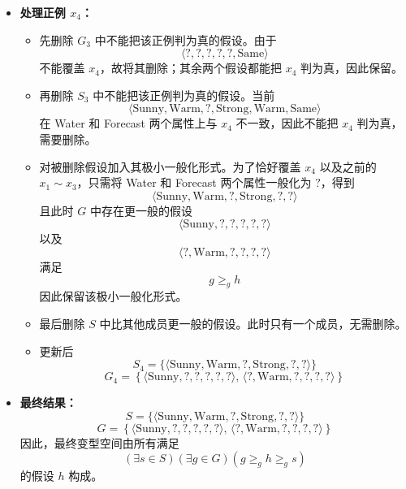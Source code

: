 \documentclass[../main.tex]{subfiles}
\begin{document}
\begin{enumerate}
{\begin{itemize}
        \item \textbf{处理正例 $x_4$：}
        \begin{itemize}
            \item 先删除 $G_3$ 中不能把该正例判为真的假设。由于
            \[
                \langle ?, ?, ?, ?, ?, \text{Same} \rangle
            \]
            不能覆盖 $x_4$，故将其删除；其余两个假设都能把 $x_4$ 判为真，因此保留。
            \item 再删除 $S_3$ 中不能把该正例判为真的假设。当前
            \[
                \langle \text{Sunny}, \text{Warm}, ?, \text{Strong}, \text{Warm}, \text{Same} \rangle
            \]
            在 Water 和 Forecast 两个属性上与 $x_4$ 不一致，因此不能把 $x_4$ 判为真，需要删除。
            \item 对被删除假设加入其极小一般化形式。为了恰好覆盖 $x_4$ 以及之前的$x_1\sim x_3$，只需将 Water 和 Forecast 两个属性一般化为 $?$，得到
            \[
                \langle \text{Sunny}, \text{Warm}, ?, \text{Strong}, ?, ? \rangle
            \]
            且此时 $G$ 中存在更一般的假设
            \[
                \langle \text{Sunny}, ?, ?, ?, ?, ? \rangle
            \]
            以及
            \[
                \langle ?, \text{Warm}, ?, ?, ?, ? \rangle
            \]
            满足
            \[
                g \geq_g h
            \]
            因此保留该极小一般化形式。
            \item 最后删除 $S$ 中比其他成员更一般的假设。此时只有一个成员，无需删除。
            \item 更新后
            \[
                S_4=\{\langle \text{Sunny}, \text{Warm}, ?, \text{Strong}, ?, ? \rangle\}
            \]
            \[
                G_4=
                \left\{
                \langle \text{Sunny}, ?, ?, ?, ?, ? \rangle,\,
                \langle ?, \text{Warm}, ?, ?, ?, ? \rangle
                \right\}
            \]
        \end{itemize}

        \item \textbf{最终结果：}
        \[
            S=\{\langle \text{Sunny}, \text{Warm}, ?, \text{Strong}, ?, ? \rangle\}
        \]
        \[
            G=
            \left\{
            \langle \text{Sunny}, ?, ?, ?, ?, ? \rangle,\,
            \langle ?, \text{Warm}, ?, ?, ?, ? \rangle
            \right\}
        \]
        因此，最终变型空间由所有满足
        \[
            (\exists s\in S)(\exists g\in G)(g \geq_g h \geq_g s)
        \]
        的假设 $h$ 构成。
    \end{itemize}
    }


\end{enumerate}
\end{document}
